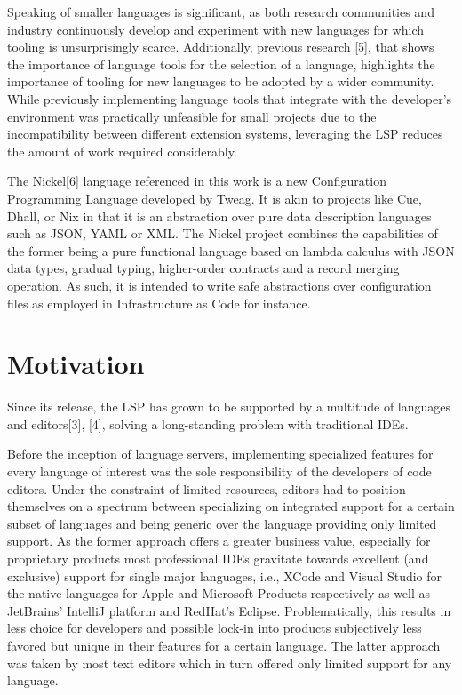 \documentclass[
  a4paper,
  bibtex,
  english,
  nomenclature]{kthlatex/kththesis/kththesis}
\begin{document}
Speaking of smaller languages is significant, as both research
communities and industry continuously develop and experiment with new
languages for which tooling is unsurprisingly scarce. Additionally,
previous research {[}5{]}, that shows the importance of language tools
for the selection of a language, highlights the importance of tooling
for new languages to be adopted by a wider community. While previously
implementing language tools that integrate with the developer's
environment was practically unfeasible for small projects due to the
incompatibility between different extension systems, leveraging the LSP
reduces the amount of work required considerably.

The Nickel{[}6{]} language referenced in this work is a new
Configuration Programming Language developed by Tweag. It is akin to
projects like Cue, Dhall, or Nix in that it is an abstraction over pure
data description languages such as JSON, YAML or XML. The Nickel project
combines the capabilities of the former being a pure functional language
based on lambda calculus with JSON data types, gradual typing,
higher-order contracts and a record merging operation. As such, it is
intended to write safe abstractions over configuration files as employed
in Infrastructure as Code for instance.

\hypertarget{sec:motivation}{%
\section{Motivation}\label{sec:motivation}}

Since its release, the LSP has grown to be supported by a multitude of
languages and editors{[}3{]}, {[}4{]}, solving a long-standing problem
with traditional IDEs.

Before the inception of language servers, implementing specialized
features for every language of interest was the sole responsibility of
the developers of code editors. Under the constraint of limited
resources, editors had to position themselves on a spectrum between
specializing on integrated support for a certain subset of languages and
being generic over the language providing only limited support. As the
former approach offers a greater business value, especially for
proprietary products most professional IDEs gravitate towards excellent
(and exclusive) support for single major languages, i.e., XCode and
Visual Studio for the native languages for Apple and Microsoft Products
respectively as well as JetBrains' IntelliJ platform and RedHat's
Eclipse. Problematically, this results in less choice for developers and
possible lock-in into products subjectively less favored but unique in
their features for a certain language. The latter approach was taken by
most text editors which in turn offered only limited support for any
language.
\end{document}
